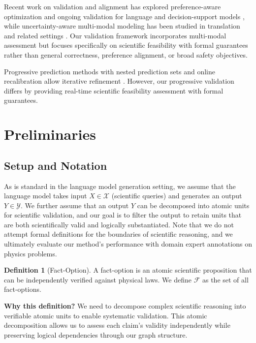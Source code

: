 \documentclass{uai2026} %
\theoremstyle{remark}
\theoremstyle{plain}
\theoremstyle{definition}
\newtheorem{definition}[theorem]{Definition}
\begin{document}
Recent work on validation and alignment has explored preference-aware optimization and ongoing validation for language and decision-support models \cite{pmlr-v244-lin24a,pmlr-v286-chen25b}, while uncertainty-aware multi-modal modeling has been studied in translation and related settings \cite{pmlr-v286-liu25c}. Our validation framework incorporates multi-modal assessment but focuses specifically on scientific feasibility with formal guarantees rather than general correctness, preference alignment, or broad safety objectives.

Progressive prediction methods with nested prediction sets and online recalibration allow iterative refinement \cite{pmlr-v244-jazbec24a,pmlr-v286-deshpande25a}. However, our progressive validation differs by providing real-time scientific feasibility assessment with formal guarantees.

\section{Preliminaries}

\subsection{Setup and Notation}

As is standard in the language model generation setting, we assume that the language model takes input $X \in \mathcal{X}$ (scientific queries) and generates an output $Y \in \mathcal{Y}$. We further assume that an output $Y$ can be decomposed into atomic units for scientific validation, and our goal is to filter the output to retain units that are both scientifically valid and logically substantiated. Note that we do not attempt formal definitions for the boundaries of scientific reasoning, and we ultimately evaluate our method's performance with domain expert annotations on physics problems.

\begin{definition}[Fact-Option]
\label{def:fact-option}
A fact-option is an atomic scientific proposition that can be independently verified against physical laws. We define $\mathcal{F}$ as the set of all fact-options.
\end{definition}

\textbf{Why this definition?} We need to decompose complex scientific reasoning into verifiable atomic units to enable systematic validation. This atomic decomposition allows us to assess each claim's validity independently while preserving logical dependencies through our graph structure.
\end{document}

